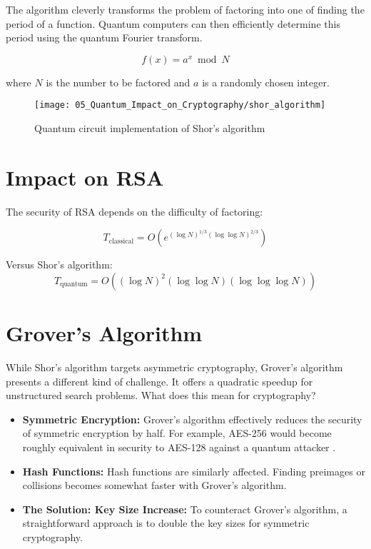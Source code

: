 The algorithm cleverly transforms the problem of factoring into one of finding the period of a function. Quantum computers can then efficiently determine this period using the quantum Fourier transform.

\begin{equation}\label{eq:shor_period}
    f(x) = a^x \bmod N
\end{equation}

where $N$ is the number to be factored and $a$ is a randomly chosen integer.

\begin{figure}[h]
    \centering
    \texttt{[image: 05\_Quantum\_Impact\_on\_Cryptography/shor\_algorithm]}
    \caption{Quantum circuit implementation of Shor's algorithm}
    \label{fig:shor_circuit}
\end{figure}

\section{Impact on RSA}\label{sec:rsa_impact}

The security of RSA depends on the difficulty of factoring:

\begin{equation}\label{eq:rsa_complexity}
    T_{\text{classical}} = O(e^{(\log N)^{1/3}(\log \log N)^{2/3}})
\end{equation}

Versus Shor's algorithm:
\begin{equation}\label{eq:shor_complexity}
    T_{\text{quantum}} = O((\log N)^2(\log \log N)(\log \log \log N))
\end{equation}

\section{Grover's Algorithm}\label{sec:grovers_algorithm}

While Shor's algorithm targets asymmetric cryptography, Grover's algorithm \parencite{grover1996fast} presents a different kind of challenge. It offers a quadratic speedup for unstructured search problems. What does this mean for cryptography?

\begin{itemize}
    \item \textbf{Symmetric Encryption:} Grover's algorithm effectively reduces the security of symmetric encryption by half. For example, AES-256 would become roughly equivalent in security to AES-128 against a quantum attacker \parencite{nist2001aes}.
    \item \textbf{Hash Functions:} Hash functions are similarly affected. Finding preimages or collisions becomes somewhat faster with Grover's algorithm.
    \item \textbf{The Solution: Key Size Increase:} To counteract Grover's algorithm, a straightforward approach is to double the key sizes for symmetric cryptography.
\end{itemize}

